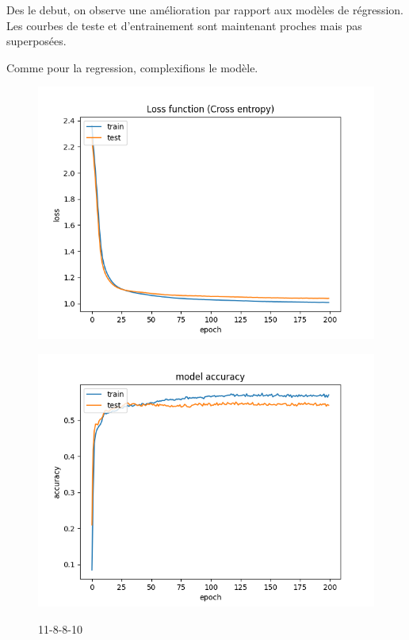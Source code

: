 Des le debut, on observe une amélioration par rapport aux modèles de régression. Les courbes de
teste et d'entrainement sont maintenant proches mais pas superposées.

Comme pour la regression, complexifions le modèle.

\vspace{1cm}

\begin{figure}[!htb]
    \begin{minipage}{0.5\textwidth}
        \centering
        \includegraphics[width=1\textwidth]{../images/11-8-8/Loss_function(Cross_entropy).png}
        \label{fig:11-8-8-10}
    \end{minipage}\hfill
    \begin{minipage}{0.5\textwidth}
        \centering
        \includegraphics[width=1\textwidth]{../images/11-8-8/model_accuracy(Cross_entropy).png}
        \label{fig:11-8-8-10.2}
    \end{minipage}
    \caption{11-8-8-10}
\end{figure}


